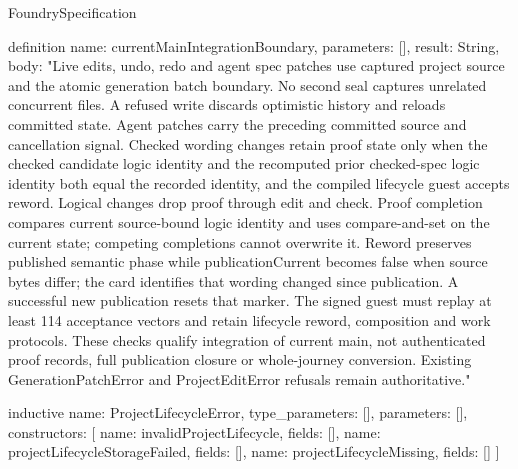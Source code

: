 \begin{lexlean}{FoundrySpecification}
\begin{semanticmodule}
definition{
  name: currentMainIntegrationBoundary,
  parameters: [],
  result: String,
  body: "Live edits, undo, redo and agent spec patches use captured project source and the atomic generation batch boundary. No second seal captures unrelated concurrent files. A refused write discards optimistic history and reloads committed state. Agent patches carry the preceding committed source and cancellation signal. Checked wording changes retain proof state only when the checked candidate logic identity and the recomputed prior checked-spec logic identity both equal the recorded identity, and the compiled lifecycle guest accepts reword. Logical changes drop proof through edit and check. Proof completion compares current source-bound logic identity and uses compare-and-set on the current state; competing completions cannot overwrite it. Reword preserves published semantic phase while publicationCurrent becomes false when source bytes differ; the card identifies that wording changed since publication. A successful new publication resets that marker. The signed guest must replay at least 114 acceptance vectors and retain lifecycle reword, composition and work protocols. These checks qualify integration of current main, not authenticated proof records, full publication closure or whole-journey conversion. Existing GenerationPatchError and ProjectEditError refusals remain authoritative."
}

inductive{
  name: ProjectLifecycleError,
  type_parameters: [],
  parameters: [],
  constructors: [
    {name: invalidProjectLifecycle, fields: []},
    {name: projectLifecycleStorageFailed, fields: []},
    {name: projectLifecycleMissing, fields: []}
  ]
}


\end{semanticmodule}
\end{lexlean}
